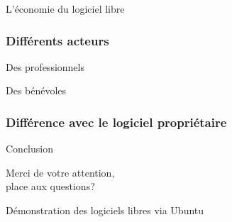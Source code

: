\documentclass{beamer}
\begin{document}
\begin{frame}
\begin{center}
\Huge{L'économie du logiciel libre}
\end{center}
\end{frame}
\begin{frame}
\frametitle{Différents acteurs}
\begin{block}{Des professionnels}
\begin{itemize}
\end{itemize}
\end{block}

\begin{block}{Des bénévoles}
\begin{itemize}
\end{itemize}
\end{block}
\end{frame}
\begin{frame}
\frametitle{Différence avec le logiciel propriétaire}
\end{frame}

\begin{frame}
\begin{center}
\Huge{Conclusion}
\end{center}
\end{frame}

\begin{frame}
\begin{center}
\Huge{Merci de votre attention, \\place aux questions?}
\end{center}
\end{frame}

\begin{frame}
\begin{center}
\Huge{Démonstration des logiciels libres via Ubuntu}
\end{center}
\end{frame}
\end{document}

